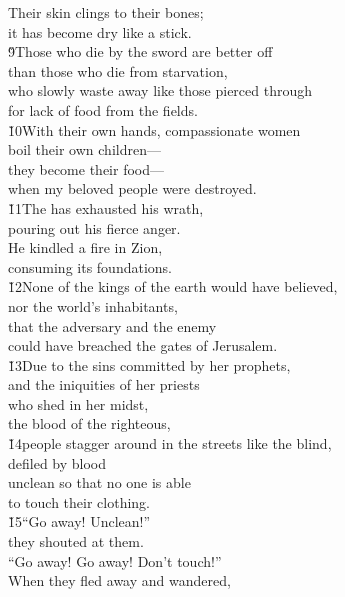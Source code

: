 \begin{poetry}
\poeml Their skin clings to their bones; \\
\poemll    it has become dry like a stick. \\
\poeml \v{9}Those who die by the sword are better off \\
\poemll    than those who die from starvation, \\
\poeml who slowly waste away like those pierced through \\
\poemll    for lack of food from the fields. \\
\poeml \v{10}With their own hands, compassionate women \\
\poemll    boil their own children--- \\
\poeml they become their food--- \\
\poemll    when my beloved people were destroyed. \\
\poeml \v{11}The  has exhausted his wrath, \\
\poemll    pouring out his fierce anger. \\
\poeml He kindled a fire in Zion, \\
\poemll    consuming its foundations. \\
\poeml \v{12}None of the kings of the earth would have believed, \\
\poemll    nor the world's inhabitants, \\
\poeml that the adversary and the enemy \\
\poemll    could have breached the gates of Jerusalem. \\
\poeml \v{13}Due to the sins committed by her prophets, \\
\poemll    and the iniquities of her priests \\
\poeml who shed in her midst, \\
\poemll    the blood of the righteous, \\
\poeml \v{14}people stagger around in the streets like the blind, \\
\poemll    defiled by blood \\
\poeml unclean so that no one is able \\
\poemll    to touch their clothing. \\
\poeml \v{15}``Go away! Unclean!'' \\
\poemll    they shouted at them. \\
\poemlll       ``Go away! Go away! Don't touch!'' \\
\poeml When they fled away and wandered, \\

\end{poetry}

